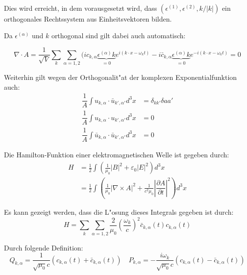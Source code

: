 Dies wird erreicht, in dem vorausgesetzt wird, dass $(\epsilon^{(1)}, \epsilon^{(2)} , k/|k|)$ ein orthogonales Rechtssystem aus Einheitsvektoren bilden.

Da $\epsilon^{(\alpha)}$ und $k$ orthogonal sind gilt dabei auch automatisch:

\begin{equation}
\nabla \cdot A = \frac{1}{\sqrt{V}} \sum_k \sum_{\alpha=1,2} (i c_{k,\alpha} \underbrace{\epsilon^{(\alpha)} k}_{=0} e^{i (k \cdot x - \omega_k t)} - i \bar{c}_{k,\alpha} \underbrace{\epsilon^{(\alpha)} k}_{=0} e^{-i(k \cdot x - \omega_k t)} = 0
\end{equation}

Weiterhin gilt wegen der Orthogonalit"at der komplexen Exponentialfunktion auch:
\begin{equation}
\begin{split}
\dfrac{1}{A} \int u_{k,\alpha} \cdot \bar{u}_{k',\alpha'} d^3 x &= \delta_{kk'}\delta{aa'} \\
\dfrac{1}{A} \int u_{k,\alpha} \cdot u_{k',\alpha'} d^3 x &= 0 \\
\dfrac{1}{A} \int \bar{u}_{k,\alpha} \cdot \bar{u}_{k',\alpha'} d^3 x &= 0
\end{split}
\end{equation}

Die Hamilton-Funktion einer elektromagnetischen Welle ist gegeben durch:
\begin{equation}
\begin{split}
H &= \frac{1}{2} \int (\frac{1}{\mu_0}|B|^2 + \varepsilon_0|E|^2) d^3 x \\
	&= \frac{1}{2} \int \left(\frac{1}{\mu_0} | \nabla\times A |^2 + \frac{1}{c^2 \mu_0} \left| \dfrac{\partial A}{\partial t} \right|^2 \right) d^3 x 
\end{split}
\end{equation}

Es kann gezeigt werden, dass die L"osung dieses Integrals gegeben ist durch:
\begin{equation}
H = \sum_k \sum_{\alpha=1,2} \frac{2}{\mu_0} \left(\frac{\omega_k}{c}\right)^2 \bar{c}_{k,\alpha}(t) c_{k,\alpha}(t)
\end{equation}

Durch folgende Definition:
\begin{equation}
Q_{k,\alpha} = \frac{1}{\sqrt{\mu_0} c}(c_{k,\alpha}(t) + \bar{c}_{k,\alpha}(t)) \quad P_{k,\alpha} = -\frac{i\omega_k}{\sqrt{\mu_0} c}(c_{k,\alpha}(t) - \bar{c}_{k,\alpha}(t)) 
\end{equation}

